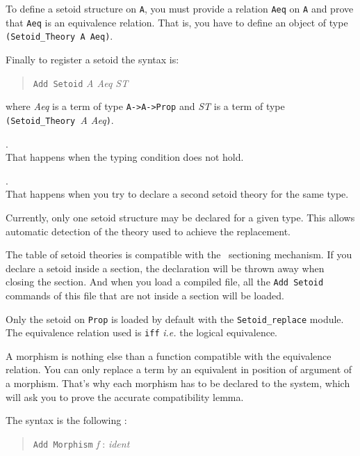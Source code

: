 To define a setoid structure on \verb+A+, you must provide a relation
\verb|Aeq| on \verb+A+ and prove that \verb|Aeq| is an equivalence
relation. That is, you have to define an object of type
\verb|(Setoid_Theory A Aeq)|.

Finally to register a setoid the syntax is:

\begin{quotation}
  \texttt{Add Setoid} \textit{ A Aeq ST}
\end{quotation}

\noindent where \textit{Aeq} is a term of type \texttt{A->A->Prop} and
\textit{ST} is a term of type 
\texttt{(Setoid\_Theory }\textit{A Aeq}\texttt{)}.

\begin{ErrMsgs}
\item {}.\\ 
  That happens when the typing condition does not hold.
\item {}.\\
  That happens when you try to declare a second setoid theory for the
  same type.
\end{ErrMsgs}

Currently, only one setoid structure
may be declared for a given type.
This allows automatic detection of the theory used to achieve the
replacement.

The table of setoid theories is compatible with the \Coq\ 
sectioning mechanism. If you declare a setoid inside a section, the
declaration will be thrown away when closing the section.
And when you load a compiled file, all the \texttt{Add Setoid}
commands of this file that are not inside a section will be loaded.

\Warning Only the setoid on \texttt{Prop} is loaded by default with the
\texttt{Setoid\_replace} module. The equivalence relation used is
\texttt{iff} {\it i.e.} the logical equivalence.


A morphism is nothing else than a function compatible with the
equivalence relation. 
You can only replace a term by an equivalent in position of argument
of a morphism. That's why each morphism has to be
declared to the system, which will ask you to prove the accurate
compatibility lemma.

The syntax is the following :
\begin{quotation}
  \texttt{Add Morphism} \textit{ f }:\textit{ ident}
\end{quotation}

